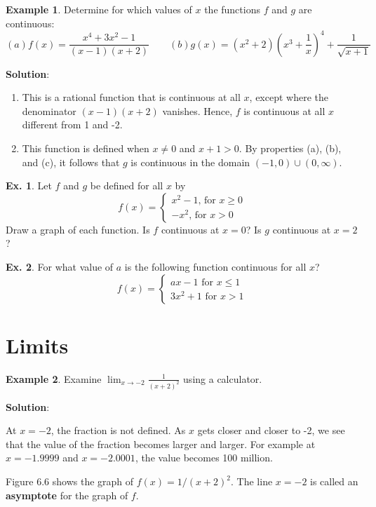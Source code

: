 \documentclass[10pt,a4paper]{book}
\theoremstyle{definition}\newtheorem{definition}{Definition}
\theoremstyle{definition}\newtheorem{fact}{Fact}
\theoremstyle{definition}\newtheorem{ex}{Ex.}
\theoremstyle{definition}\newtheorem{project}{Project}
\theoremstyle{definition}\newtheorem{problem}{Problem}
\theoremstyle{definition}\newtheorem{example}{Example}
\numberwithin{theorem}{chapter}
\numberwithin{corollary}{chapter}
\numberwithin{assumption}{chapter}
\numberwithin{definition}{chapter}
\numberwithin{prop}{chapter}
\numberwithin{notation}{chapter}
\numberwithin{problem}{chapter}
\numberwithin{example}{chapter}
\numberwithin{fact}{chapter}
\numberwithin{ex}{chapter}
\begin{document}
	\begin{example}
		Determine for which values of $x$ the functions $f$ and $g$ are continuous:
		\begin{equation*}
			(a) f(x) = \frac{x^4+3x^2-1}{(x-1)(x+2)} \qquad
			(b) g(x) = (x^2+2)\left(x^3+\frac{1}{x}\right)^4 + \frac{1}{\sqrt{x+1}}
		\end{equation*}
		
		\textbf{Solution}:
		\begin{enumerate}[label=(\alph*)]
			\item This is a rational function that is continuous at all $x$, except where the denominator $(x -1)(x + 2)$ vanishes. Hence, $f$ is continuous at all $x$ different from 1 and -2.
			\item This function is defined when $x \neq 0$ and $x + 1 > 0$. By properties (a), (b), and (c), it follows that $g$ is continuous in the domain $(-1, 0) \cup (0, \infty)$.
		\end{enumerate}
	\end{example}
	
	\begin{ex}
		Let $f$ and $g$ be defined for all $x$ by
		$$f(x) = \begin{cases}
			x^2-1 \text{, for } x \geq 0 \\
			-x^2 \text{, for } x > 0
		\end{cases}$$
		Draw a graph of each function. Is $f$ continuous at $x = 0$? Is $g$ continuous at $x = 2$?
	\end{ex}
	
	\begin{ex}
		For what value of $a$ is the following function continuous for all $x$?
		$$f(x) = \begin{cases}
			ax-1 \text{  for } x\leq 1 \\
			3x^2+1 \text{  for } x>1
		\end{cases}$$
	\end{ex}
	
	\section{Limits}
	
	\begin{example}
		Examine $\lim_{x\rightarrow -2}\frac{1}{(x+2)^2}$ using a calculator.
		
		\textbf{Solution}:
		
		At $x=-2$, the fraction is not defined. As $x$ gets closer and closer to -2, we see that the value of the fraction becomes larger and larger. For example at $x=-1.9999$ and $x=-2.0001$, the value becomes 100 million.
		
		Figure 6.6 shows the graph of $f(x) = 1/(x+2)^2$. The line $x=-2$ is called an \textbf{asymptote} for the graph of $f$.
	\end{example}
	
\end{document}
